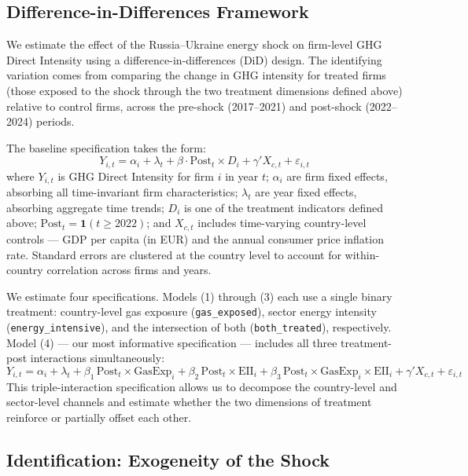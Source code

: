 \documentclass[12pt,a4paper]{article}
\begin{document}
\subsection{Difference-in-Differences Framework}

We estimate the effect of the Russia–Ukraine energy shock on firm-level GHG Direct Intensity using a difference-in-differences (DiD) design. The identifying variation comes from comparing the change in GHG intensity for treated firms (those exposed to the shock through the two treatment dimensions defined above) relative to control firms, across the pre-shock (2017–2021) and post-shock (2022–2024) periods.

The baseline specification takes the form:
\begin{equation}
Y_{i,t} = \alpha_i + \lambda_t + \beta \cdot \text{Post}_t \times D_i + \gamma' X_{c,t} + \varepsilon_{i,t}
\label{eq:did}
\end{equation}
where $Y_{i,t}$ is GHG Direct Intensity for firm $i$ in year $t$; $\alpha_i$ are firm fixed effects, absorbing all time-invariant firm characteristics; $\lambda_t$ are year fixed effects, absorbing aggregate time trends; $D_i$ is one of the treatment indicators defined above; $\text{Post}_t = \mathbf{1}(t \geq 2022)$; and $X_{c,t}$ includes time-varying country-level controls — GDP per capita (in EUR) and the annual consumer price inflation rate. Standard errors are clustered at the country level to account for within-country correlation across firms and years.

We estimate four specifications. Models (1) through (3) each use a single binary treatment: country-level gas exposure (\texttt{gas\_exposed}), sector energy intensity (\texttt{energy\_intensive}), and the intersection of both (\texttt{both\_treated}), respectively. Model (4) — our most informative specification — includes all three treatment-post interactions simultaneously:
\begin{equation}
Y_{i,t} = \alpha_i + \lambda_t
  + \beta_1 \, \text{Post}_t \times \text{GasExp}_i
  + \beta_2 \, \text{Post}_t \times \text{EII}_i
  + \beta_3 \, \text{Post}_t \times \text{GasExp}_i \times \text{EII}_i
  + \gamma' X_{c,t} + \varepsilon_{i,t}
\label{eq:triple}
\end{equation}
This triple-interaction specification allows us to decompose the country-level and sector-level channels and estimate whether the two dimensions of treatment reinforce or partially offset each other.

\subsection{Identification: Exogeneity of the Shock}
\end{document}
